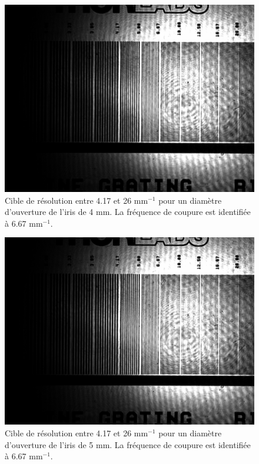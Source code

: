 \documentclass[11pt,letterpaper]{article}
\begin{document}
\begin{figure}[H]
  \centering
  \includegraphics[scale=0.28]{cible_d4_8-14.png}
  \caption{Cible de résolution entre 4.17 et 26 mm$^{-1}$ pour un diamètre d'ouverture de l'iris de 4 mm. La fréquence de coupure est identifiée à 6.67 mm$^{-1}$.}
  \label{cible4-8-14}
\end{figure}

\begin{figure}[H]
  \centering
  \includegraphics[scale=0.28]{cible_d5_8-14.png}
  \caption{Cible de résolution entre 4.17 et 26 mm$^{-1}$ pour un diamètre d'ouverture de l'iris de 5 mm. La fréquence de coupure est identifiée à 6.67 mm$^{-1}$.}
  \label{cible5}
\end{figure}
\end{document}
